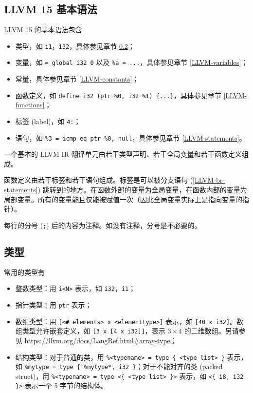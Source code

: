 \subsection{LLVM 15 基本语法}

LLVM 15 的基本语法包含
\begin{itemize}
  \item 类型，如 \texttt{i1}，\texttt{i32}，具体参见章节 \ref{LLVM-types}；
  \item 变量，如 \texttt{\@a = global i32 0} 以及
    \texttt{\%a = ...}，具体参见章节 \ref{LLVM-variables}；
  \item 常量，具体参见章节 \ref{LLVM-constants}；
  \item 函数定义，如 \texttt{define i32 \@foo(ptr \%0, i32 \%1) \{...\}}，具体参见章节
    \ref{LLVM-functions}；
  \item 标签 (label)，如 \texttt{4:}；
  \item 语句，如 \texttt{\%3 = icmp eq ptr \%0, null}，具体参见章节
    \ref{LLVM-statements}。
\end{itemize}

一个基本的 LLVM IR 翻译单元由若干类型声明、若干全局变量和若干函数定义组成。

函数定义由若干标签和若干语句组成。标签是可以被分支语句 (\ref{LLVM-br-statements})
跳转到的地方。在函数外部的变量为全局变量，在函数内部的变量为局部变量。所有的变量能且仅能被赋值一次（因此全局变量实际上是指向变量的指针）。

每行的分号 (\texttt{;}) 后的内容为注释。如没有注释，分号是不必要的。

\subsection{类型}\label{LLVM-types}

常用的类型有
\begin{itemize}
  \item 整数类型：用 \texttt{i<N>} 表示，如 \texttt{i32}，\texttt{i1}；
  \item 指针类型：用 \texttt{ptr} 表示；
  \item 数组类型：用 \texttt{[<\# elements> x <elementtype>]} 表示，如
    \texttt{[40 x i32]}。数组类型允许嵌套定义，如
    \texttt{[3 x [4 x i32]]}，表示 $3\times 4$ 的二维数组。另请参见
    \url{https://llvm.org/docs/LangRef.html#array-type}；
  \item 结构类型：对于普通的类，用 \texttt{\%<typename> = type \{ <type list> \}} 表示，如
    \texttt{\%mytype = type \{ \%mytype*, i32 \}}；对于不能对齐的类
    (packed struct)，用 \texttt{\%<typename> = type <\{ <type list> \}>}
    表示，如 \texttt{<\{ i8, i32 \}>} 表示一个 5 字节的结构体。
\end{itemize}

